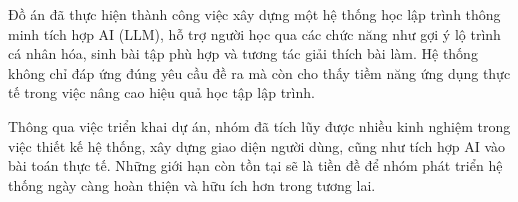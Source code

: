 Đồ án đã thực hiện thành công việc xây dựng một hệ thống học lập trình thông minh tích hợp AI (LLM), hỗ trợ người học qua các chức năng như gợi ý lộ trình cá nhân hóa, sinh bài tập phù hợp và tương tác giải thích bài làm. Hệ thống không chỉ đáp ứng đúng yêu cầu đề ra mà còn cho thấy tiềm năng ứng dụng thực tế trong việc nâng cao hiệu quả học tập lập trình.

Thông qua việc triển khai dự án, nhóm đã tích lũy được nhiều kinh nghiệm trong việc thiết kế hệ thống, xây dựng giao diện người dùng, cũng như tích hợp AI vào bài toán thực tế. Những giới hạn còn tồn tại sẽ là tiền đề để nhóm phát triển hệ thống ngày càng hoàn thiện và hữu ích hơn trong tương lai.